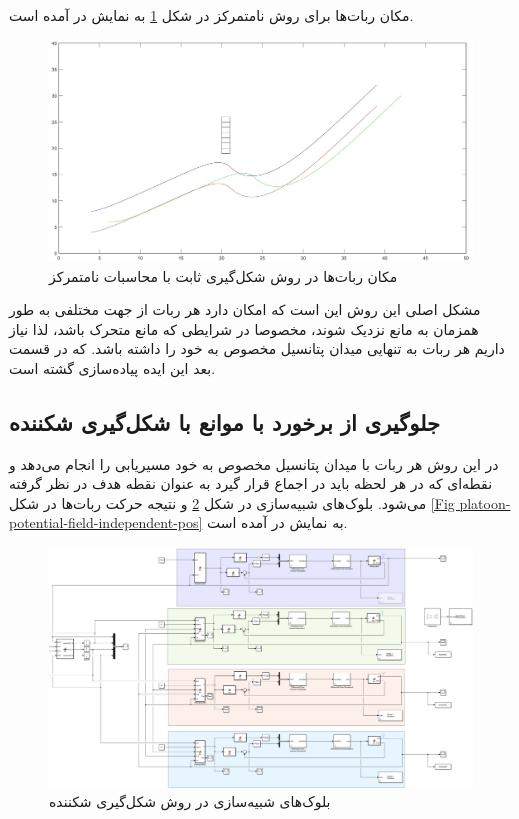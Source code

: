 مکان ربات‌ها برای روش نامتمرکز در شکل \ref{Fig platoon-potential-field-distributed-pos} به نمایش در آمده است.
\begin{figure}[!h]
	\centering
	\includegraphics[scale=0.2]{Images/platoon-potential-field-distributed-pos.jpg}
	\caption{مکان ربات‌ها در روش شکل‌گیری ثابت با محاسبات نامتمرکز}\label{Fig platoon-potential-field-distributed-pos}
\end{figure}


مشکل اصلی این روش این است که امکان دارد هر ربات از جهت مختلفی به طور همزمان به مانع نزدیک شوند، مخصوصا در شرایطی که مانع متحرک باشد، لذا نیاز داریم هر ربات به تنهایی میدان پتانسیل مخصوص به خود را داشته باشد. که در قسمت بعد این ایده پیاده‌سازی گشته است.

\subsection{جلوگیری از برخورد با موانع با شکل‌گیری شکننده}\label{sec potential-field for every robot}
در این روش هر ربات با میدان پتانسیل مخصوص به خود مسیریابی را انجام می‌دهد و نقطه‌ای که در هر لحظه باید در اجماع قرار گیرد به عنوان نقطه هدف در نظر گرفته می‌شود. بلوک‌های شبیه‌سازی در شکل \ref{Fig platoon-potential-field-independent-simulink} و نتیجه حرکت ربات‌ها در شکل \ref{Fig platoon-potential-field-independent-pos} به نمایش در آمده است.
\begin{figure}[!h]
	\centering
	\includegraphics[scale=0.2]{Images/platoon-potential-field-independent-simulink.png}
	\caption{بلوک‌های شبیه‌سازی در روش شکل‌گیری شکننده}\label{Fig platoon-potential-field-independent-simulink}
\end{figure}

